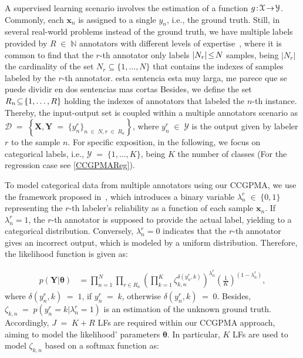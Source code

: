 \documentclass[journal]{IEEEtran}
\providecommand{\ve}[1]{{\bm{#1}}}%
\providecommand{\mat}[1]{{\bm{#1}}} %
\DeclareMathOperator{\en}{\!\,\in\!\,}
\DeclareMathOperator{\igual}{\!\,=\!\,}
\providecommand{\s}[1]{\negthinspace#1\negthinspace}%
\providecommand{\ve}[1]{{\mathbf{#1}}}
\providecommand{\mat}[1]{{\mathbf{#1}}}
\newcommand{\comment}[2]{{\color{blue}#1} {\color{red}#2}}
\begin{document}
A supervised learning scenario involves the estimation of a function
$g\s{:}\mathcal{X}\s{\to}\mathcal{Y}$. Commonly, each $\ve{x}_n$ is
assigned to a single $y_n$, i.e., the ground truth. \comment{Still, in several
real-world problems instead of the ground truth, we have multiple
labels provided by $R \en\mathbb{N}$ annotators with different levels
of expertise~\cite{raykar2010learning}, where it is common to find
that the $r$-th annotator only labels $|N_r|\s{\le}N$ samples, being
$|N_r|$ the cardinality of the set $N_r\subseteq\{1,\dots , N\}$ that
contains the indexes of samples labeled by the $r$-th
annotator. }{esta sentencia esta muy larga, me parece que se puede
dividir en dos sentencias mas cortas} Besides, we define the set
$R_n\s{\subseteq}\{1, \dots, R\}$ holding the indexes of annotators
that labeled the $n$-th instance. Thereby, the input-output set is
coupled within a multiple annotators scenario as
$\mathcal{D} \igual \left\{\mat{X}, \mat{Y} \igual \{y_n^r\}_{n\en
    N,r\en R_n} \right\}$, where $y_n^r\en \mathcal{Y}$ is the output
given by labeler $r$ to the sample $n$. For specific exposition, in
the following, we focus on categorical labels, i.e.,
$\mathcal{Y}\igual\{1,\dots, K\}$, being $K$ the number of classes
(For the regression case see \cref{CCGPMAReg}).

To model categorical data from multiple annotators using our CCGPMA,
we use the framework proposed in~\cite{rodrigues2013learning}, which
introduces a binary variable $\lambda_n^r\en \{0,1\}$ representing the
$r$-th labeler's reliability as a function of each sample
$\ve{x}_n$. If $\lambda_n^r=1$, the $r$-th annotator is supposed to
provide the actual label, yielding to a categorical
distribution. Conversely, $\lambda_n^r=0$ indicates that the $r$-th
annotator gives an incorrect output, which is modeled by a uniform
distribution. Therefore, the likelihood function is given as:

\begin{align}
\label{eq:ClasLik}
 p(\mat{Y}|\bm{\theta}) &= \prod^N_{n=1}\prod_{r\in R_n}\left(\prod_{k=1}^{K}\zeta_{k,n}^{\delta(y_n^r,k)}\right)^{{\lambda}_n^r}\left(\frac{1}{K}\right)^{(1-{\lambda}_n^r)},
\end{align}
where $\delta(y_n^r,k)\igual 1$, if $y_n^r\igual k$, otherwise $\delta(y_n^r,k)\igual0$. Besides, $\zeta_{k,n}\igual p(y_n^r=k|\lambda_n^r=1)$ is an estimation of the unknown ground truth. Accordingly, $J\igual K+R$ LFs are required within our CCGPMA approach, aiming to model the likelihood' parameters $\bm{\theta}$. In particular, $K$ LFs are used to model $\zeta_{k,n}$ based on a softmax function as:
\end{document}
